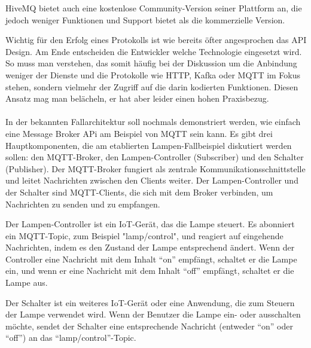 HiveMQ bietet auch eine kostenlose Community-Version seiner Plattform an, die jedoch weniger Funktionen und Support bietet als die kommerzielle Version. 

Wichtig für den Erfolg eines Protokolls ist wie bereits öfter angesprochen das API Design. Am Ende entscheiden die Entwickler welche Technologie eingesetzt wird. So muss man verstehen, das somit häufig bei der Diskussion um die Anbindung weniger der Dienste und  die Protokolle wie HTTP, Kafka oder MQTT im Fokus stehen, sondern vielmehr der Zugriff auf die darin kodierten Funktionen. Diesen Ansatz mag man belächeln, er hat aber leider einen hohen Praxisbezug.  
\\\\
In der bekannten Fallarchitektur soll nochmals demonstriert werden, wie einfach eine Message Broker APi am Beispiel von MQTT sein kann. Es gibt drei Hauptkomponenten, die am etablierten Lampen-Fallbeispiel diskutiert werden sollen: den MQTT-Broker, den Lampen-Controller (Subscriber) und den Schalter (Publisher). Der MQTT-Broker fungiert als zentrale Kommunikationsschnittstelle und leitet Nachrichten zwischen den Clients weiter. Der Lampen-Controller und der Schalter sind MQTT-Clients, die sich mit dem Broker verbinden, um Nachrichten zu senden und zu empfangen.

Der Lampen-Controller ist ein IoT-Gerät, das die Lampe steuert. Es abonniert ein MQTT-Topic, zum Beispiel "lamp/control", und reagiert auf eingehende Nachrichten, indem es den Zustand der Lampe entsprechend ändert. Wenn der Controller eine Nachricht mit dem Inhalt \enquote{on} empfängt, schaltet er die Lampe ein, und wenn er eine Nachricht mit dem Inhalt \enquote{off} empfängt, schaltet er die Lampe aus.

Der Schalter ist ein weiteres IoT-Gerät oder eine Anwendung, die zum Steuern der Lampe verwendet wird. Wenn der Benutzer die Lampe ein- oder ausschalten möchte, sendet der Schalter eine entsprechende Nachricht (entweder \enquote{on} oder \enquote{off}) an das \enquote{lamp/control}-Topic.

